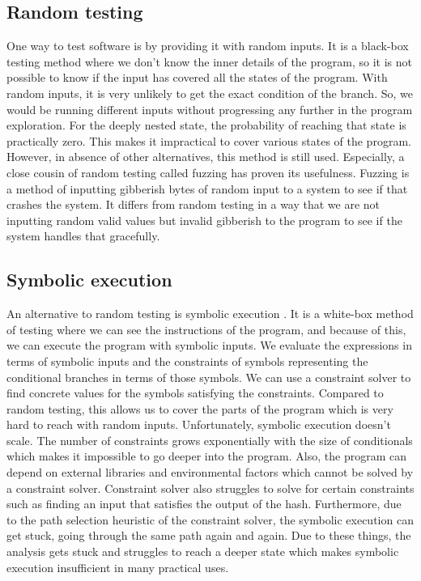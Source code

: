 \documentclass[ runningheads,
               a4paper]{llncs}
\begin{document}
\subsection{Random testing}
One way to test software is by providing it with random inputs. It is a black-box testing method where we don't know the inner details of the program, so it is not possible to know if the input has covered all the states of the program. With random inputs, it is very unlikely to get the exact condition of the branch. So, we would be running different inputs without progressing any further in the program exploration. For the deeply nested state, the probability of reaching that state is practically zero. This makes it impractical to cover various states of the program. However, in absence of other alternatives, this method is still used. Especially, a close cousin of random testing called fuzzing \cite{godefroid2020fuzzing, miller1990empirical} has proven its usefulness. Fuzzing is a method of inputting gibberish bytes of random input to a system to see if that crashes the system. It differs from random testing in a way that we are not inputting random valid values but invalid gibberish to the program to see if the system handles that gracefully.


\subsection{Symbolic execution}
An alternative to random testing is symbolic execution \cite{king1976symbolic, baldoni2018survey, cadar2011symbolic}. It is a white-box method of testing where we can see the instructions of the program, and because of this, we can execute the program with symbolic inputs. We evaluate the expressions in terms of symbolic inputs and the constraints of symbols representing the conditional branches in terms of those symbols. We can use a constraint solver to find concrete values for the symbols satisfying the constraints. Compared to random testing, this allows us to cover the parts of the program which is very hard to reach with random inputs. Unfortunately, symbolic execution doesn't scale. The number of constraints grows exponentially with the size of conditionals which makes it impossible to go deeper into the program. Also, the program can depend on external libraries and environmental factors which cannot be solved by a constraint solver. Constraint solver also struggles to solve for certain constraints such as finding an input that satisfies the output of the hash. Furthermore, due to the path selection heuristic of the constraint solver, the symbolic execution can get stuck, going through the same path again and again. Due to these things, the analysis gets stuck and struggles to reach a deeper state which makes symbolic execution insufficient in many practical uses.
\end{document}

